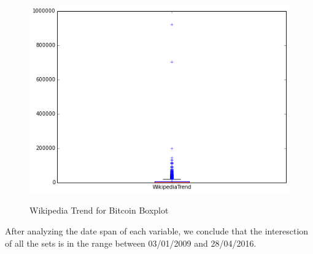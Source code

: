 \begin{figure}[bth]
  \myfloatalign
  {\includegraphics[width=1\linewidth]
    {gfx/wikipedia-trend-for-bitcoin-boxplot}}
  \caption{Wikipedia Trend for Bitcoin
    Boxplot}
  \label{fig:wikipedia-trend-for-bitcoin-boxplot}
\end{figure}

\clearpage

After analyzing the date span of each variable, we conclude that the
interesction of all the sets is in the range between 03/01/2009 and
28/04/2016.



